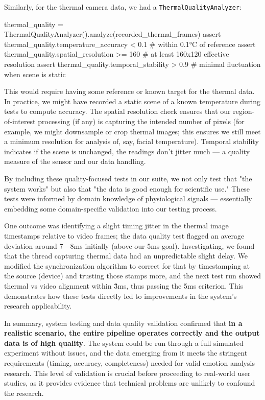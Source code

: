 Similarly, for the thermal camera data, we had a
\texttt{ThermalQualityAnalyzer}:

    thermal_quality = ThermalQualityAnalyzer().analyze(recorded_thermal_frames)
    assert thermal_quality.temperature_accuracy < 0.1  # within 0.1°C of reference
    assert thermal_quality.spatial_resolution >= 160   # at least 160x120 effective resolution
    assert thermal_quality.temporal_stability > 0.9    # minimal fluctuation when scene is static

This would require having some reference or known target for the thermal
data. In practice, we might have recorded a static scene of a known
temperature during tests to compute accuracy. The spatial resolution
check ensures that our region-of-interest processing (if any) is
capturing the intended number of pixels (for example, we might
downsample or crop thermal images; this ensures we still meet a minimum
resolution for analysis of, say, facial temperature). Temporal stability
 indicates if the scene is unchanged, the readings don't jitter
much --- a quality measure of the sensor and our data handling.

By including these quality-focused tests in our suite, we not only test
that "the system works" but also that "the data is good enough for
scientific use." These tests were informed by domain knowledge of
physiological signals --- essentially embedding some domain-specific
validation into our testing process.

One outcome was identifying a slight timing jitter in the thermal image
timestamps relative to video frames; the data quality test flagged an
average deviation around 7---8ms initially (above our 5ms goal).
Investigating, we found that the thread capturing thermal data had an
unpredictable slight delay. We modified the synchronization algorithm to
correct for that by timestamping at the source (device) and trusting
those stamps more, and the next test run showed thermal vs video
alignment within \~3ms, thus passing the \<5ms criterion. This
demonstrates how these tests directly led to improvements in the
system's research applicability.

In summary, system testing and data quality validation confirmed that
\textbf{in a realistic scenario, the entire pipeline operates correctly and
the output data is of high quality}. The system could be run through a
full simulated experiment without issues, and the data emerging from it
meets the stringent requirements (timing, accuracy, completeness) needed
for valid emotion analysis research. This level of validation is crucial
before proceeding to real-world user studies, as it provides evidence
that technical problems are unlikely to confound the research.

